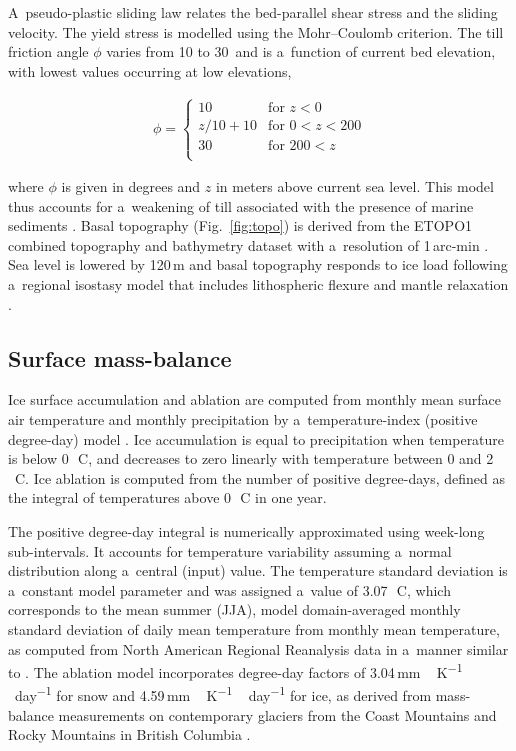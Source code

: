\documentclass[tc, ms]{copernicus}
\begin{document}
A~pseudo-plastic sliding law \citep{aschwanden-etal-2013} relates the bed-parallel shear stress and the sliding velocity. The yield stress is modelled using the Mohr--Coulomb criterion. The till friction angle $\phi$ varies from 10 to 30\degree\ and is a~function of current bed elevation, with lowest values occurring at low elevations,

\begin{align}
  \phi =
  \begin{cases}
    10      & \text{for }       z<  0 \\
    z/10+10 & \text{for }    0 <z<200 \\
    30      & \text{for }  200 <z     \\
  \end{cases}
\end{align}

where $\phi$ is given in degrees and $z$ in meters above current sea level. This model thus accounts for a~weakening of till associated with the presence of marine sediments \citep{martin-etal-2011,aschwanden-etal-2013}. Basal topography (Fig.~\ref{fig:topo}) is derived from the ETOPO1 combined topography and bathymetry dataset with a~resolution of 1\,arc-min \citep{data:etopo1}. Sea level is lowered by 120\,m and basal topography responds to ice load following a~regional isostasy model that includes lithospheric flexure and mantle relaxation \citep{lingle-clark-1985}.

\subsection{Surface mass-balance}

Ice surface accumulation and ablation are computed from monthly mean surface air temperature and monthly precipitation by a~temperature-index (positive degree-day) model \citep{hock-2003}. Ice accumulation is equal to precipitation when temperature is below 0\,\unit{{\degree}C}, and decreases to zero linearly with temperature between 0 and 2\,\unit{{\degree}C}. Ice ablation is computed from the number of positive degree-days, defined as the integral of temperatures above 0\,\unit{{\degree}C} in one year. 

The positive degree-day integral \citep{calov-greve-2005} is numerically approximated using week-long sub-intervals. It accounts for temperature variability assuming a~normal distribution along a~central (input) value. The temperature standard deviation is a~constant model parameter and was assigned a~value of 3.07\,\unit{{\degree}C}, which corresponds to the mean summer (JJA), model domain-averaged monthly standard deviation of daily mean temperature from monthly mean temperature, as computed from North American Regional Reanalysis data \citep{data:narr} in a~manner similar to \citet{seguinot-2013}. The ablation model incorporates degree-day factors of 3.04\,\unit{mm\,K^{-1}\,day^{-1}} for snow and 4.59\,\unit{mm\,K^{-1}\,day^{-1}} for ice, as derived from mass-balance measurements on contemporary glaciers from the Coast Mountains and Rocky Mountains in British Columbia \citep{shea-etal-2009}.
\end{document}
